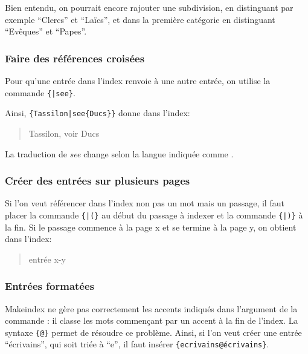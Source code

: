 Bien entendu, on pourrait encore rajouter une subdivision, en distinguant par exemple \enquote{Clercs} et \enquote{Laïcs}, et dans la première catégorie en distinguant \enquote{Evêques} et \enquote{Papes}. 


 
\subsubsection{Faire des références croisées}

Pour qu'une entrée dans l'index renvoie à une autre entrée, on utilise la commande  \verb|{|\verb+|see+\verb|}|. 

Ainsi,  \verb+{Tassilon|see{Ducs}}+ donne dans l'index:

\begin{quotation}
Tassilon, voir Ducs
\end{quotation}
La traduction de \emph{see} change selon la langue indiquée comme . 



  

\subsubsection{Créer des entrées sur plusieurs pages}

Si l'on veut référencer dans l'index non pas un mot mais un passage, il faut placer la commande \verb|{|\verb+|(}+ au début du passage à indexer et la commande  \verb|{|\verb+|)}+ à la fin. Si le passage commence à la page x et se termine à la page y, on obtient dans l'index: 

\begin{quotation}
entrée x-y
\end{quotation}


\subsubsection{Entrées formatées}

Makeindex ne gère pas correctement les accents indiqués dans l'argument de la commande  : il classe les mots commençant par un accent à la fin de l'index. La syntaxe \verb|{|\verb|@|\verb+}+ permet de résoudre ce problème. Ainsi, si l'on veut créer une entrée \enquote{écrivains}, qui soit triée à \enquote{e}, il faut insérer \verb|{ecrivains@écrivains}|.

